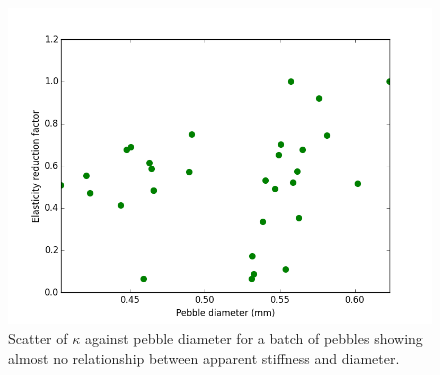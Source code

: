 \begin{figure}[!ht]
\centering
    \includegraphics[width=\doubleimagewidth]{chapters/figures/fzk-kappa-dp-scatter.png}
    \caption{Scatter of $\kappa$ against pebble diameter for a batch of \lis pebbles showing almost no relationship between apparent stiffness and diameter.}
    \label{fig:fzk-kappa-dp-scatter}
\end{figure}


